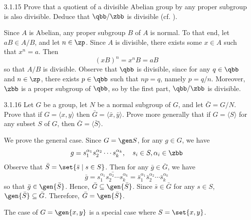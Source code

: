 \begin{exercise}{3.1.15}
    Prove that a quotient of a divisible Abelian group by any proper subgroup is also divisible.
	Deduce that $\qbb/\zbb$ is divisible (cf. ).
\end{exercise}

\begin{sol}
    Since $A$ is Abelian, any proper subgroup $B$ of $A$ is normal.
	To that end, let $aB \in A/B$, and let $n \in \zp$.
	Since $A$ is divisible, there exists some $x \in A$ such that $x^n = a$.
	Then
    \[
    	(xB)^n = x^n B = aB
    \]
    so that $A/B$ is divisible.
	Observe that $\qbb$ is divisible, since for any $q \in \qbb$ and $n \in \zp$, there exists $p \in \qbb$ such that $np = q$, namely $p = q/n$.
	Moreover, $\zbb$ is a proper subgroup of $\qbb$, so by the first part, $\qbb/\zbb$ is divisible.
\end{sol}

\begin{spex}{3.1.16}
    Let $G$ be a group, let $N$ be a normal subgroup of $G$, and let $\bar{G} = G/N$.
	Prove that if $G = \langle x, y \rangle$ then $\bar{G} = \langle \bar{x}, \bar{y} \rangle$.
	Prove more generally that if $G = \langle S \rangle$ for any subset $S$ of $G$, then $\bar{G} = \langle \bar{S} \rangle$.
\end{spex}

\begin{sol}[spsol]
    We prove the general case.
	Since $G = \gen S$, for any $g \in G$, we have
    \[
    	g = s_1^{\alpha_1} s_2^{\alpha_2} \cdots s_k^{\alpha_k}, \quad s_i \in S, \alpha_i \in \zbb
    \]
    Observe that $\bar S = \set{\bar s \mid s \in S}$.
	Then for any $\bar g \in \bar G$, we have
    \[
    	\bar g = \bar{s_1^{\alpha_1} s_2^{\alpha_2} \cdots s_k^{\alpha_k}} = \bar s_1^{\alpha_1} \bar s_2^{\alpha_2} \cdots \bar s_k^{\alpha_k}
    \]
    so that $\bar g \in \gen{\bar S}$.
	Hence, $\bar G \subseteq \gen{\bar S}$.
	Since $\bar s \in \bar G$ for any $s \in S$, $\gen{\bar S} \subseteq \bar G$.
	Therefore, $\bar G = \gen{\bar S}$.

    The case of $G = \gen{x, y}$ is a special case where $S = \set{x, y}$.
\end{sol}

